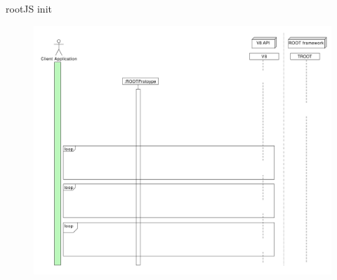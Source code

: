 \begin{frame}{rootJS init}
  \begin{figure}[htb]
    \centering
      \includegraphics[width=\textwidth, height=.85\textheight, keepaspectratio]{./resources/initialize/initialize_h1.pdf}
  \end{figure}
\end{frame}

